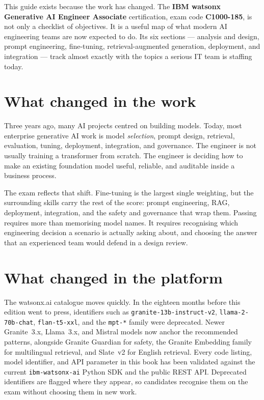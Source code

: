 This guide exists because the work has changed. The \textbf{IBM watsonx Generative AI Engineer Associate} certification, exam code \textbf{C1000-185}, is not only a checklist of objectives. It is a useful map of what modern AI engineering teams are now expected to do. Its six sections --- analysis and design, prompt engineering, fine-tuning, retrieval-augmented generation, deployment, and integration --- track almost exactly with the topics a serious IT team is staffing today.

\section*{What changed in the work}

Three years ago, many AI projects centred on building models. Today, most enterprise generative AI work is model \emph{selection}, prompt design, retrieval, evaluation, tuning, deployment, integration, and governance. The engineer is not usually training a transformer from scratch. The engineer is deciding how to make an existing foundation model useful, reliable, and auditable inside a business process.

The exam reflects that shift. Fine-tuning is the largest single weighting, but the surrounding skills carry the rest of the score: prompt engineering, RAG, deployment, integration, and the safety and governance that wrap them. Passing requires more than memorising model names. It requires recognising which engineering decision a scenario is actually asking about, and choosing the answer that an experienced team would defend in a design review.

\section*{What changed in the platform}

The watsonx.ai catalogue moves quickly. In the eighteen months before this edition went to press, identifiers such as \texttt{granite-13b-instruct-v2}, \texttt{llama-2-70b-chat}, \texttt{flan-t5-xxl}, and the \texttt{mpt-*} family were deprecated. Newer Granite~3.x, Llama~3.x, and Mistral models now anchor the recommended patterns, alongside Granite Guardian for safety, the Granite Embedding family for multilingual retrieval, and Slate~v2 for English retrieval. Every code listing, model identifier, and API parameter in this book has been validated against the current \texttt{ibm-watsonx-ai} Python SDK and the public REST API. Deprecated identifiers are flagged where they appear, so candidates recognise them on the exam without choosing them in new work.

